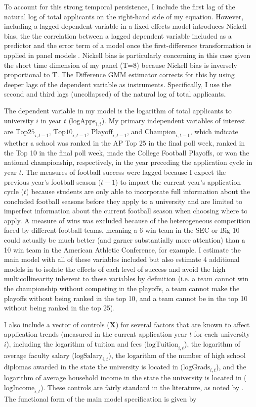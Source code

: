\documentclass[12pt,english]{article}
\begin{document}
To account for this strong temporal persistence, I include the first lag of the natural log of total applicants on the right-hand side of my equation. However, including a lagged dependent variable in a fixed effects model introduces Nickell bias, the the correlation between a lagged dependent variable included as a predictor and the error term of a model once the first-difference transformation is applied in panel models \citet{nickell81}. Nickell bias is particularly concerning in this case given the short time dimension of my panel (T=8) because Nickell bias is inversely proportional to T. The Difference GMM estimator corrects for this by using deeper lags of the dependent variable as instruments. Specifically, I use the second and third lags (uncollapsed) of the natural log of total applicants.

The dependent variable in my model is the logarithm of total applicants to university $i$ in year $t$ ($\text{logApps}_{i,t}$). My primary independent variables of interest are $\text{Top25}_{i,t-1}$, $\text{Top10}_{i,t-1}$, $\text{Playoff}_{i,t-1}$, and $\text{Champion}_{i,t-1}$, which indicate whether a school was ranked in the AP Top 25 in the final poll week, ranked in the Top 10 in the final poll week, made the College Football Playoffs, or won the national championship, respectively, in the year preceding the application cycle in year $t$. The measures of football success were lagged because I expect the previous year’s football season ($t-1$) to impact the current year’s application cycle ($t$) because students are only able to incorporate full information about the concluded football seasons before they apply to a university and are limited to imperfect information about the current football season when choosing where to apply. A measure of wins was excluded because of the heterogeneous competition faced by different football teams, meaning a 6 win team in the SEC or Big 10 could actually be much better (and garner substantially more attention) than a 10 win team in the American Athletic Conference, for example. I estimate the main model with all of these variables included but also estimate 4 additional models in to isolate the effects of each level of success and avoid the high multicollinearity inherent to these variables by definition (i.e. a team cannot win the championship without competing in the playoffs, a team cannot make the playoffs without being ranked in the top 10, and a team cannot be in the top 10 without being ranked in the top 25).

I also include a vector of controls ($\boldsymbol{X}$) for several factors that are known to affect application trends (measured in the current application year $t$ for each university $i$), including the logarithm of tuition and fees ($\text{logTuition}_{i,t}$), the logarithm of average faculty salary ($\text{logSalary}_{i,t}$), the logarithm of the number of high school diplomas awarded in the state the university is located in ($\text{logGrads}_{i,t}$), and the logarithm of average household income in the state the university is located in ($\text{logIncome}_{i,t}$). These controls are fairly standard in the literature, as noted by  \citet{pope2009}. The functional form of the main model specification is given by
\end{document}
